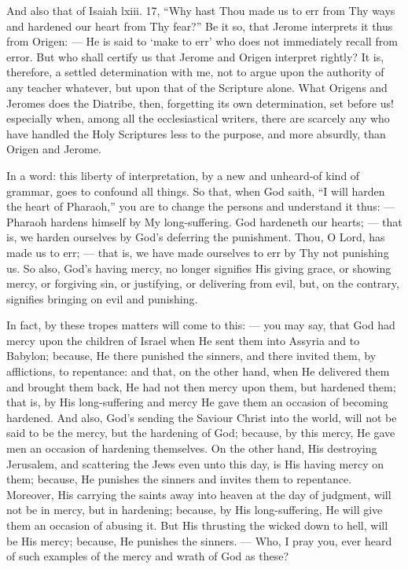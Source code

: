 And also that of Isaiah lxiii. 17, “Why hast Thou made us to err from Thy ways and hardened our heart from Thy fear?” Be it so, that Jerome interprets it thus from Origen: — He is said to ‘make to err’ who does not immediately recall from error. But who shall certify us that Jerome and Origen interpret rightly? It is, therefore, a settled determination with me, not to argue upon the authority of any teacher whatever, but upon that of the Scripture alone. What Origens and Jeromes does the Diatribe, then, forgetting its own determination, set before us! especially when, among all the ecclesiastical writers, there are scarcely any who have handled the Holy Scriptures less to the purpose, and more absurdly, than Origen and Jerome.

In a word: this liberty of interpretation, by a new and unheard-of kind of grammar, goes to confound all things. So that, when God saith, “I will harden the heart of Pharaoh,” you are to change the persons and understand it thus: — Pharaoh hardens himself by My long-suffering. God hardeneth our hearts; — that is, we harden ourselves by God’s deferring the punishment. Thou, O Lord, has made us to err; — that is, we have made ourselves to err by Thy not punishing us. So also, God’s having mercy, no longer signifies His giving grace, or showing mercy, or forgiving sin, or justifying, or delivering from evil, but, on the contrary, signifies bringing on evil and punishing.

In fact, by these tropes matters will come to this: — you may say, that God had mercy upon the children of Israel when He sent them into Assyria and to Babylon; because, He there punished the sinners, and there invited them, by afflictions, to repentance: and that, on the other hand, when He delivered them and brought them back, He had not then mercy upon them, but hardened them; that is, by His long-suffering and mercy He gave them an occasion of becoming hardened. And also, God’s sending the Saviour Christ into the world, will not be said to be the mercy, but the hardening of God; because, by this mercy, He gave men an occasion of hardening themselves. On the other hand, His destroying Jerusalem, and scattering the Jews even unto this day, is His having mercy on them; because, He punishes the sinners and invites them to repentance. Moreover, His carrying the saints away into heaven at the day of judgment, will not be in mercy, but in hardening; because, by His long-suffering, He will give them an occasion of abusing it. But His thrusting the wicked down to hell, will be His mercy; because, He punishes the sinners. — Who, I pray you, ever heard of such examples of the mercy and wrath of God as these?

